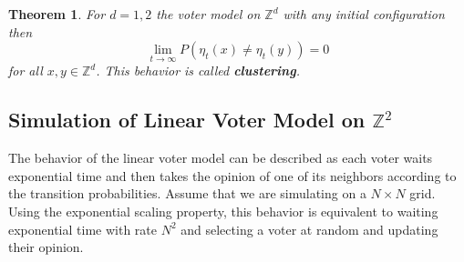 \documentclass{article}
\theoremstyle{plain}
\newtheorem{theorem}{Theorem}[section]
\theoremstyle{definition}
\theoremstyle{remark}
\numberwithin{equation}{section}
\newcommand{\Z}{\mathbb{Z}}
\begin{document}
\begin{theorem} \cite{swart2017course}
For $d = 1,2$ the voter model on $\Z^d$ with any initial configuration then
$$
\lim_{t \to \infty} P(\eta_t(x) \not = \eta_t(y)) = 0
$$
for all $x,y \in \Z^d$.
This behavior is called \textbf{clustering}.
\end{theorem}

\subsection{Simulation of Linear Voter Model on \texorpdfstring{$\Z^2$}{Z2}}

The behavior of the linear voter model can be described as each voter waits exponential time and then takes the opinion of one of its neighbors according to the transition probabilities.
Assume that we are simulating on a $N \times N$ grid.
Using the exponential scaling property, this behavior is equivalent to waiting exponential time with rate $N^2$ and selecting a voter at random and updating their opinion.

\clearpage


\end{document}

